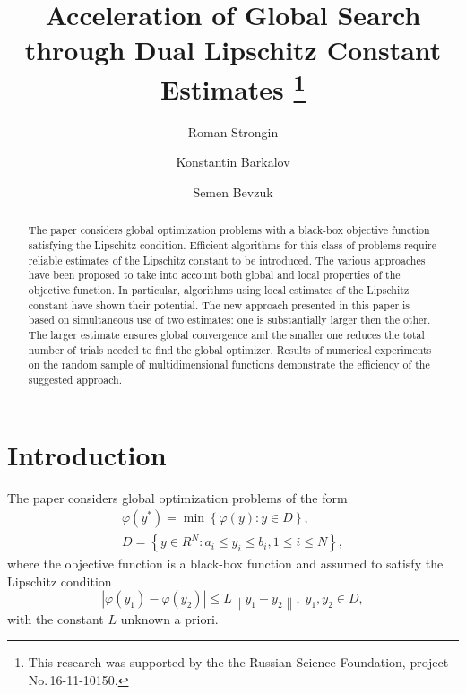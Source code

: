 \documentclass[runningheads]{llncs}
\begin{document}
%
\title{Acceleration of Global Search through Dual Lipschitz Constant Estimates
\thanks{This research was supported by the the Russian Science Foundation,
project No.\,16-11-10150.}}
%
%
\author{Roman Strongin%
\and Konstantin Barkalov%
\and Semen Bevzuk%
}
%
%
%
\maketitle              %
%
\begin{abstract}
The paper considers global optimization problems with a black-box objective 
function satisfying the Lipschitz condition. Efficient algorithms for this 
class of problems require reliable estimates of the Lipschitz constant to be 
introduced. The various approaches have been proposed to take into account both
global and local properties of the objective function. In particular, algorithms
using local estimates of the Lipschitz constant have shown their potential.
The new approach presented in this paper is based on simultaneous use of two
estimates: one is substantially larger then the other. 
The larger estimate ensures global convergence and the smaller one reduces 
the total number of trials needed to find the global optimizer.
Results of numerical experiments on the random sample of multidimensional 
functions demonstrate the efficiency of the suggested approach.  

\end{abstract}
%
%
%
\section{Introduction}

The paper considers global optimization problems of the form 
\begin{gather}
 \varphi(y^\ast)=\min{\left\{\varphi(y):y\in D\right\}}, \label{problem}\\
 D=\left\{y\in R^N: a_i\leq y_i \leq b_i, 1\leq i \leq N\right\} \label{D},
\end{gather}
where the objective function is a black-box function and assumed to satisfy the Lipschitz condition
\[
\left|\varphi(y_1)-\varphi(y_2)\right|\leq L\left\|y_1-y_2\right\|,\; y_1,y_2 \in D,
\]
with the constant $L$ unknown a priori.
\end{document}
